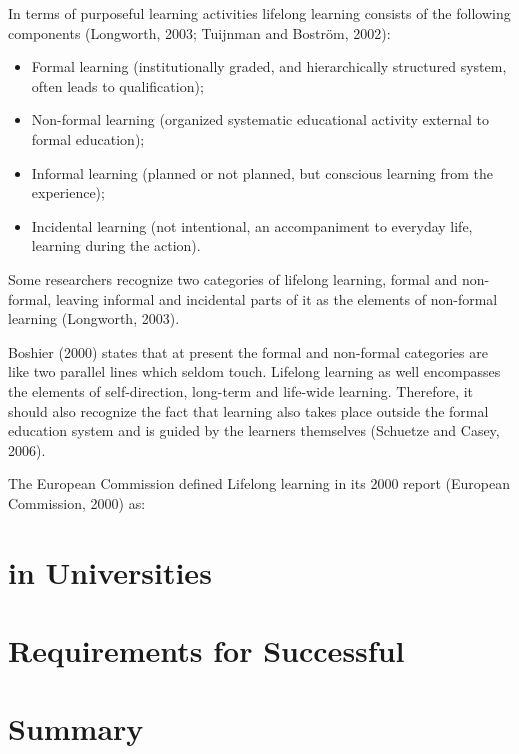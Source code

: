 In terms of purposeful learning activities lifelong learning consists of the
following components (Longworth, 2003; Tuijnman and Boström, 2002):

\begin{itemize}
  \item Formal learning (institutionally graded, and hierarchically structured
system, often leads to qualification);
  \item Non-formal learning (organized systematic educational activity external
to formal education);
  \item Informal learning (planned or not planned, but conscious learning from
the experience);
  \item Incidental learning (not intentional, an accompaniment to everyday life,
learning during the action).
\end{itemize} 

Some researchers recognize two categories of lifelong learning, formal and
non-formal, leaving informal and incidental parts of it as the elements of
non-formal learning (Longworth, 2003).

Boshier (2000) states that at present the formal and non-formal categories are
like two parallel lines which seldom touch. Lifelong learning as well
encompasses the elements of self-direction, long-term and life-wide learning.
Therefore, it should also recognize the fact that learning also takes place
outside the formal education system and is guided by the learners themselves
(Schuetze and Casey, 2006). 

The European Commission defined Lifelong learning in its 2000 report (European
Commission, 2000) as:


\section{\LLLc in Universities}

\section{Requirements for Successful \LLLc}

\section{Summary} 